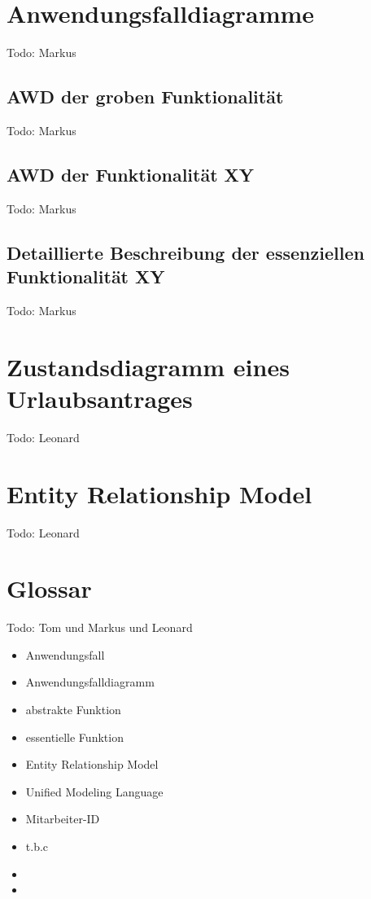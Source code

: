 \chapter{Anwendungsfalldiagramme}
Todo: Markus
\section{AWD der groben Funktionalität}
Todo: Markus
\section{AWD der Funktionalität XY}
Todo: Markus
\section{Detaillierte Beschreibung der essenziellen Funktionalität XY}
Todo: Markus
\chapter{Zustandsdiagramm eines Urlaubsantrages}
Todo: Leonard
\chapter{Entity Relationship Model}
Todo: Leonard
\chapter{Glossar}
Todo: Tom und Markus und Leonard 

\begin{itemize}
	\item Anwendungsfall
	\item Anwendungsfalldiagramm
	\item abstrakte Funktion
	\item essentielle Funktion
	\item Entity Relationship Model
	\item Unified Modeling Language
	\item Mitarbeiter-ID
	\item t.b.c
	\item
	\item 
\end{itemize}



